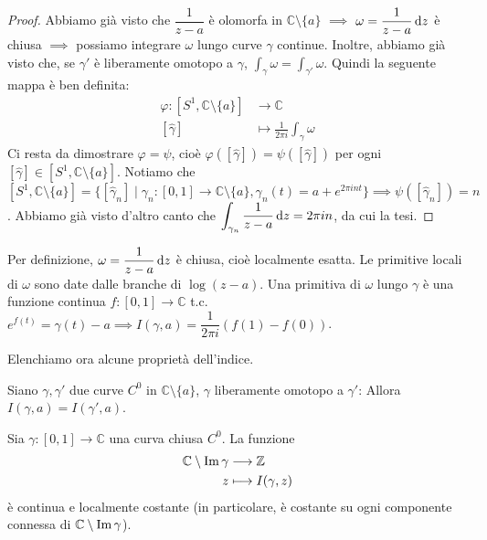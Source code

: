 \begin{proof}
  Abbiamo già visto che $\dfrac{1}{z-a}$ è olomorfa in $\mathbb{C}\setminus\{a\}$ $\implies$ $\omega=\dfrac{1}{z-a}\mathop{}\!\mathrm{d} z$ è chiusa $\implies$ possiamo integrare $\omega$ lungo curve $\gamma$ continue. Inoltre, abbiamo già visto che, se $\gamma'$ è liberamente omotopo a $\gamma$, $\displaystyle \int_{\gamma}\omega=\int_{\gamma'}\omega$. Quindi la seguente mappa è ben definita:
  \begin{align*}
    \varphi:[S^1, \mathbb{C}\setminus\{a\}] &\longrightarrow \mathbb{C}\\
    [\hat{\gamma}] &\longmapsto \frac{1}{2\pi i}\int_{\gamma}\omega
  \end{align*}
  Ci resta da dimostrare $\varphi=\psi$, cioè $\varphi([\hat{\gamma}])=\psi([\hat{\gamma}])$ per ogni $[\hat{\gamma}] \in [S^1, \mathbb{C}\setminus\{a\}]$.
  Notiamo che $[S^1, \mathbb{C}\setminus\{a\}]=\{[\hat{\gamma}_n] \mid \gamma_n:[0,1]\longrightarrow \mathbb{C}\setminus\{a\}, \gamma_n(t)=a+e^{2\pi int}\} \implies \psi([\hat{\gamma}_n])=n$.
  Abbiamo già visto d'altro canto che $\displaystyle \int_{\gamma_n} \frac{1}{z-a}\mathop{}\!\mathrm{d} z=2\pi i n$, da cui la tesi.
\end{proof}

\begin{oss}
  Per definizione, $\omega=\dfrac{1}{z-a}\mathop{}\!\mathrm{d} z$ è chiusa, cioè localmente esatta. Le primitive locali di $\omega$ sono date dalle branche di $\log(z-a)$. Una primitiva di $\omega$ lungo $\gamma$ è una funzione continua $f:[0,1]\longrightarrow \mathbb{C}$ t.c. $e^{f(t)}=\gamma(t)-a \implies I(\gamma, a)=\dfrac{1}{2\pi i}(f(1)-f(0))$.
\end{oss}

Elenchiamo ora alcune proprietà dell'indice.

\begin{oss}
  Siano $\gamma, \gamma'$ due curve $C^0$ in $\mathbb{C}\setminus\{a\}$, $\gamma$ liberamente omotopo a $\gamma'$: Allora $I(\gamma, a)=I(\gamma',a)$.
\end{oss}

\begin{prop}
  Sia $\gamma:[0,1]\longrightarrow \mathbb{C}$ una curva chiusa $C^0$. La funzione
  \begin{align*}
    \mathbb{C}\setminus\operatorname{Im}{\gamma} &\longrightarrow \mathbb{Z}\\
    z &\longmapsto I(\gamma,z)
  \end{align*}
  è continua e localmente costante (in particolare, è costante su ogni componente connessa di $\mathbb{C}\setminus\operatorname{Im}{\gamma}$).
\end{prop}

